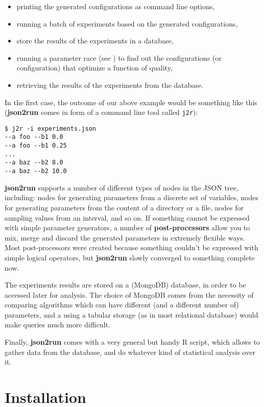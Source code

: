 \documentclass[11pt,notitlepage,twoside,a4paper]{article}
\begin{document}
\begin{itemize}
\item
  printing the generated configurations as command line options,
\item
  running a batch of experiments based on the generated configurations,
\item
  store the results of the experiments in a database,
\item
  running a parameter race (see \cite{Birattari2010}) to find out the configurations (or
  configuration) that optimize a function of quality,
\item
  retrieving the results of the experiments from the database.
\end{itemize}

In the first case, the outcome of our above example would be something
like this (\textbf{json2run} comes in form of a command line tool called
\texttt{j2r}):

\begin{lstlisting}
$ j2r -i experiments.json
--a foo --b1 0.0
--a foo --b1 0.25
...
--a baz --b2 8.0
--a baz --b2 10.0
\end{lstlisting}

\textbf{json2run} supports a number of different types of nodes in the
JSON tree, including: nodes for generating parameters from a discrete
set of variables, nodes for generating parameters from the content of a
directory or a file, nodes for sampling values from an interval, and so
on. If something cannot be expressed with simple parameter generators, a
number of \textbf{post-processors} allow you to mix, merge and discard
the generated parameters in extremely flexible ways. Most
post-processors were created because something couldn't be expressed
with simple logical operators, but \textbf{json2run} slowly converged to
something complete now.

The experiments results are stored on a (MongoDB) database, in order to
be accessed later for analysis. The choice of MongoDB comes from the
necessity of comparing algorithms which can have different (and a
different number of) parameters, and a using a tabular storage (as in
most relational database) would make queries much more difficult.

Finally, \textbf{json2run} comes with a very general but handy R script,
which allows to gather data from the database, and do whatever kind of
statistical analysis over it.

\section{Installation}
\end{document}
